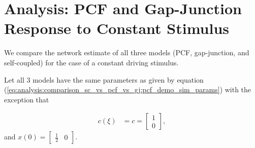 \section{Analysis: PCF  and Gap-Junction Response to Constant Stimulus}

 We compare the network estimate of all three models (PCF, gap-junction, and self-coupled) for the case of a constant driving stimulus. 
 
 Let all 3 models have the same parameters as given by equation (\ref{eq:analysis:comparison_sc_vs_pcf_vs_gj:pcf_demo_sim_params}) with the exception that 

\begin{align*}
	c(\xi) &= c = 
	\begin{bmatrix}
		1 \\ 0	
	\end{bmatrix}, 
\end{align*}
and
$x(0) = \begin{bmatrix} \frac{1}{2} & 0 \end{bmatrix}$. 
 
